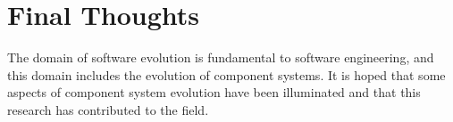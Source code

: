 




\section{Final Thoughts}
The domain of software evolution is fundamental to software engineering, and this domain includes the evolution of component systems.
It is hoped that some aspects of component system evolution have been illuminated and that this research has contributed to the field. 

 
